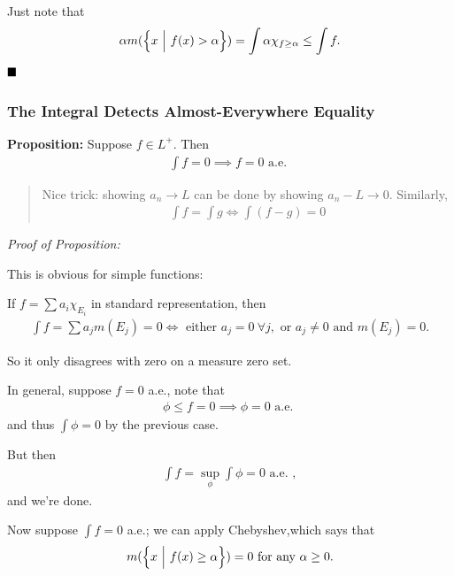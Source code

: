 Just note that
\begin{align*}
\alpha m(\left\{{x {~\mathrel{\Big|}~} f(x) > \alpha}\right\}) = \int \alpha \chi_{f \geq \alpha} \leq \int f
.\end{align*} \(\qed\)

\hypertarget{the-integral-detects-almost-everywhere-equality}{%
\subsubsection{The Integral Detects Almost-Everywhere
Equality}\label{the-integral-detects-almost-everywhere-equality}}

\textbf{Proposition:} Suppose \(f\in L^+\). Then
\begin{align*}
\int f = 0 \implies f = 0 \text{ a.e. }
\end{align*}

\begin{quote}
Nice trick: showing \(a_n \to L\) can be done by showing
\(a_n - L \to 0\). Similarly,
\begin{align*}
\int f = \int g \iff \int (f-g) = 0 
\end{align*}
\end{quote}

\emph{Proof of Proposition:}

This is obvious for simple functions:

If \(f = \sum a_i \chi_{E_i}\) in standard representation, then
\begin{align*}
\int f = \sum a_j m(E_j) = 0 \iff \text{ either } a_j = 0 ~\forall j, \text{ or } a_j \neq 0 \text{ and } m(E_j) = 0
.\end{align*}

So it only disagrees with zero on a measure zero set.

In general, suppose \(f = 0\) a.e., note that
\begin{align*}
\phi \leq f = 0 \implies \phi = 0 \text{ a.e. }
\end{align*} and thus \(\int \phi = 0\) by the previous case.

But then
\begin{align*}
\int f = \sup_\phi \int \phi = 0 \text{ a.e. }
,\end{align*} and we're done.

Now suppose \(\int f = 0\) a.e.; we can apply Chebyshev,which says that
\begin{align*}
m(\left\{{x {~\mathrel{\Big|}~} f(x) \geq \alpha}\right\}) = 0 
\text{ for any } 
\alpha \geq 0
.\end{align*}

